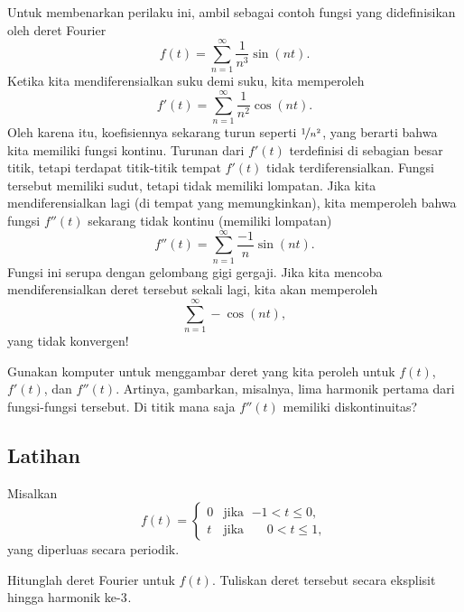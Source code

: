 Untuk membenarkan perilaku ini, ambil sebagai contoh fungsi yang didefinisikan oleh
deret Fourier
\begin{equation*}
f(t) = \sum_{n=1}^\infty \frac{1}{n^3} \sin (n t) .
\end{equation*}
Ketika kita mendiferensialkan suku demi suku, kita memperoleh
\begin{equation*}
f'(t) = \sum_{n=1}^\infty \frac{1}{n^2} \cos (n t) .
\end{equation*}
Oleh karena itu, koefisiennya sekarang turun seperti $\nicefrac{1}{n^2}$, yang
berarti bahwa kita memiliki fungsi kontinu.
Turunan
dari $f'(t)$ terdefinisi
di sebagian besar titik, tetapi terdapat titik-titik tempat $f'(t)$ tidak terdiferensialkan.
Fungsi tersebut memiliki sudut, tetapi tidak memiliki lompatan.
Jika kita
mendiferensialkan lagi (di tempat yang memungkinkan), kita memperoleh bahwa fungsi
$f''(t)$
sekarang tidak kontinu (memiliki lompatan)
\begin{equation*}
f''(t) = \sum_{n=1}^\infty \frac{-1}{n} \sin (n t) .
\end{equation*}
Fungsi ini serupa dengan gelombang gigi gergaji.  Jika kita mencoba mendiferensialkan
deret tersebut sekali lagi, kita akan memperoleh
\begin{equation*}
\sum_{n=1}^\infty -\cos (n t) ,
\end{equation*}
yang tidak konvergen!

\begin{exercise}
Gunakan komputer untuk menggambar deret yang kita peroleh untuk $f(t)$, $f'(t)$, dan
$f''(t)$.  Artinya, gambarkan, misalnya, lima harmonik pertama dari fungsi-fungsi tersebut.  Di
titik mana saja $f''(t)$ memiliki diskontinuitas?
\end{exercise}

\subsection{Latihan}

\begin{exercise}
Misalkan
\begin{equation*}
f(t) =
\begin{cases}
0 & \text{jika } \; {-1} < t \leq 0 , \\
t & \text{jika } \; \phantom{-}0 < t \leq  1 ,
\end{cases}
\end{equation*}
yang diperluas secara periodik.
\begin{tasks}
\task Hitunglah deret Fourier untuk $f(t)$.
\task Tuliskan deret tersebut secara eksplisit hingga harmonik ke-$3^{\text{}}$.
\end{tasks}
\end{exercise}

